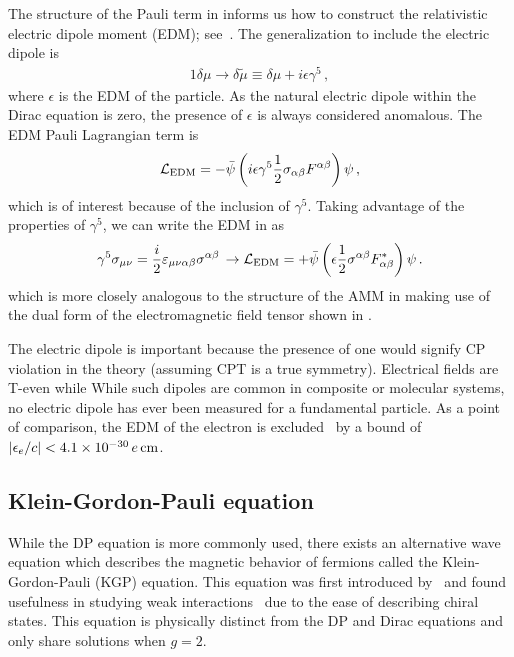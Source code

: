The structure of the Pauli term in  informs us how to construct the relativistic electric dipole moment (EDM); see~\cite{Knecht:2003kc,Jegerlehner:2017gek}. The generalization to include the electric dipole is
\begin{alignat}{1}
	\label{edm:1} \delta\mu\rightarrow\delta\tilde{\mu}\equiv\delta\mu+i\epsilon\gamma^{5}\,,
\end{alignat}
where $\epsilon$ is the EDM of the particle. As the natural electric dipole within the Dirac equation is zero, the presence of $\epsilon$ is always considered anomalous. The EDM Pauli Lagrangian term is
\begin{align}
    \label{ledm:1}
    {\cal L}_{\rm EDM} = -{\bar\psi}\left(i\epsilon\gamma^{5}\frac{1}{2}\sigma_{\alpha\beta}F^{\alpha\beta}\right)\psi\,,
\end{align}
which is of interest because of the inclusion of $\gamma^{5}$. Taking advantage of the properties of $\gamma^{5}$, we can write the EDM in  as
\begin{align}
    \label{ledm:3}
    \gamma^{5}\sigma_{\mu\nu}=\frac{i}{2}\varepsilon_{\mu\nu\alpha\beta}\sigma^{\alpha\beta}\,\rightarrow
    {\cal L}_{\rm EDM} = +{\bar\psi}\left(\epsilon\frac{1}{2}\sigma^{\alpha\beta}F_{\alpha\beta}^{*}\right)\psi\,.
\end{align}
which is more closely analogous to the structure of the AMM in  making use of the dual form of the electromagnetic field tensor shown in .

The electric dipole is important because the presence of one would signify CP violation in the theory (assuming CPT is a true symmetry). Electrical fields are T-even while While such dipoles are common in composite or molecular systems, no electric dipole has ever been measured for a fundamental particle. As a point of comparison, the EDM of the electron is excluded~\citep{ACME:2018yjb,Roussy:2022cmp} by a bound of $|\epsilon_{e}/c|<4.1\times10^{-30}\, e\,{\rm cm}$.

\subsection{Klein-Gordon-Pauli equation}
\label{sec:kgp}
\noindent While the DP equation is more commonly used, there exists an alternative wave equation which describes the magnetic behavior of fermions called the Klein-Gordon-Pauli (KGP) equation. This equation was first introduced by~\cite{Fock:1937dy} and found usefulness in studying weak interactions~\citep{Feynman:1958ty} due to the ease of describing chiral states. This equation is physically distinct from the DP and Dirac equations and only share solutions when $g=2$.

